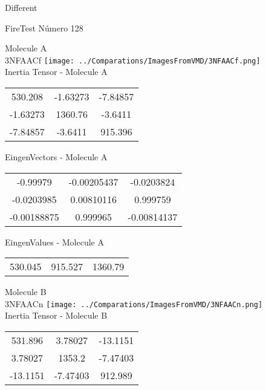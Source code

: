 \begin{center}
\vtab
\vtab
\textcolor{NavyBlue}{\Large Different}
\end{center}

 \newpage

\vtab[-2cm]
\begin{center}
{\large FireTest \tab Número 128}
\end{center}
\begin{multicols}{2}
\begin{center}

Molecule A \\ 
3NFAACf
\texttt{[image: ../Comparations/ImagesFromVMD/3NFAACf.png]}
\\
Inertia Tensor - Molecule A \\
\vtab

\begin{tabular}{|c c c|}
530.208	 & 	-1.63273	 & 	-7.84857	 \\
-1.63273	 & 	1360.76	 & 	-3.6411	 \\
-7.84857	 & 	-3.6411	 & 	915.396
\end{tabular}

\vtab
 EingenVectors - Molecule A     \\
\vtab
\begin{tabular}{|c c c|}
-0.99979	 & 	-0.00205437	 & 	-0.0203824	 \\
-0.0203985	 & 	0.00810116	 & 	0.999759	 \\
-0.00188875	 & 	0.999965	 & 	-0.00814137
\end{tabular}

\vtab
 EingenValues - Molecule A     \\
\vtab
\begin{tabular}{|c c c|}
530.045	 & 	915.527	 & 	1360.79	 \\
\end{tabular}
\columnbreak

Molecule B \\ 
3NFAACn
\texttt{[image: ../Comparations/ImagesFromVMD/3NFAACn.png]}
\\
Inertia Tensor - Molecule B \\
\vtab

\begin{tabular}{|c c c|}
531.896	 & 	3.78027	 & 	-13.1151	 \\
3.78027	 & 	1353.2	 & 	-7.47403	 \\
-13.1151	 & 	-7.47403	 & 	912.989
\end{tabular}


\end{center}
\end{multicols}

